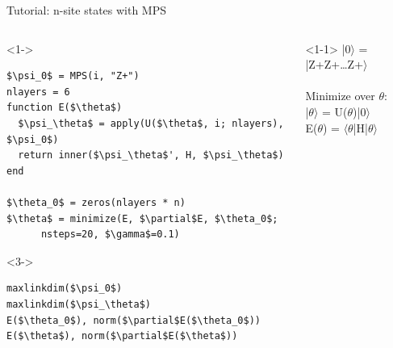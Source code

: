\begin{frame}[fragile]{Tutorial: n-site states with MPS}

\begin{columns}

\begin{column}{5.5cm}

\begin{onlyenv}<1->
\begin{lstlisting}[language=JuliaLocal, style=julia, mathescape, basicstyle=\small]
$\psi_0$ = MPS(i, "Z+")
nlayers = 6
function E($\theta$)
  $\psi_\theta$ = apply(U($\theta$, i; nlayers), $\psi_0$)
  return inner($\psi_\theta$', H, $\psi_\theta$)
end

$\theta_0$ = zeros(nlayers * n)
$\theta$ = minimize(E, $\partial$E, $\theta_0$;
      nsteps=20, $\gamma$=0.1)
\end{lstlisting}
\end{onlyenv}

\begin{onlyenv}<3->
\begin{lstlisting}[language=JuliaLocal, style=julia, mathescape, basicstyle=\small]
maxlinkdim($\psi_0$)
maxlinkdim($\psi_\theta$)
E($\theta_0$), norm($\partial$E($\theta_0$))
E($\theta$), norm($\partial$E($\theta$))
\end{lstlisting}
\end{onlyenv}

\end{column}

\begin{column}{4.5cm}

\begin{onlyenv}<1-1>
|0$\rangle$ = |Z+Z+…Z+$\rangle$ \\
~\\
Minimize over $\theta$: \\
|$\theta\rangle$ = U($\theta$)|0$\rangle$ \\
E($\theta$) = $\langle\theta$|H|$\theta\rangle$ \\
~\\
~\\
~\\
~\\
~\\
\end{onlyenv}


\end{column}
\end{columns}
\end{frame}
